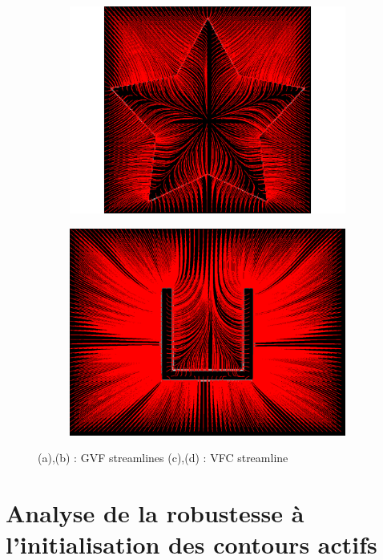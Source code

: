 \begin{figure}[H]
\begin{subfigure}[c]{0.4\linewidth}
\includegraphics[width=\textwidth]{Chapters/Images/Conc/vfcsstream}
\caption{}
\end{subfigure}
\begin{subfigure}[c]{0.4\linewidth}
\centering
\includegraphics[width=\textwidth]{Chapters/Images/Conc/vfcsqstream}
\caption{}
\end{subfigure}
\caption{(a),(b) : GVF streamlines (c),(d) : VFC streamline}
\end{figure}

\section{Analyse de la robustesse à l'initialisation des contours actifs}
\label{ann_init_results}

